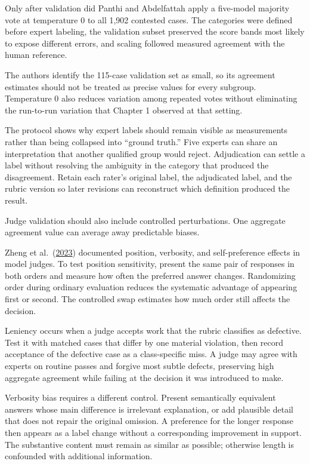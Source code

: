 Only after validation did Panthi and Abdelfattah apply a five-model majority vote at temperature 0 to all 1,902 contested cases. The categories were defined before expert labeling, the validation subset preserved the score bands most likely to expose different errors, and scaling followed measured agreement with the human reference.

The authors identify the 115-case validation set as small, so its agreement estimates should not be treated as precise values for every subgroup. Temperature 0 also reduces variation among repeated votes without eliminating the run-to-run variation that Chapter 1 observed at that setting.

The protocol shows why expert labels should remain visible as measurements rather than being collapsed into ``ground truth.'' Five experts can share an interpretation that another qualified group would reject. Adjudication can settle a label without resolving the ambiguity in the category that produced the disagreement. Retain each rater's original label, the adjudicated label, and the rubric version so later revisions can reconstruct which definition produced the result.

Judge validation should also include controlled perturbations. One aggregate agreement value can average away predictable biases.

Zheng et al.~(\href{https://arxiv.org/abs/2306.05685}{2023}) documented position, verbosity, and self-preference effects in model judges. To test position sensitivity, present the same pair of responses in both orders and measure how often the preferred answer changes. Randomizing order during ordinary evaluation reduces the systematic advantage of appearing first or second. The controlled swap estimates how much order still affects the decision.

Leniency occurs when a judge accepts work that the rubric classifies as defective. Test it with matched cases that differ by one material violation, then record acceptance of the defective case as a class-specific miss. A judge may agree with experts on routine passes and forgive most subtle defects, preserving high aggregate agreement while failing at the decision it was introduced to make.

Verbosity bias requires a different control. Present semantically equivalent answers whose main difference is irrelevant explanation, or add plausible detail that does not repair the original omission. A preference for the longer response then appears as a label change without a corresponding improvement in support. The substantive content must remain as similar as possible; otherwise length is confounded with additional information.


